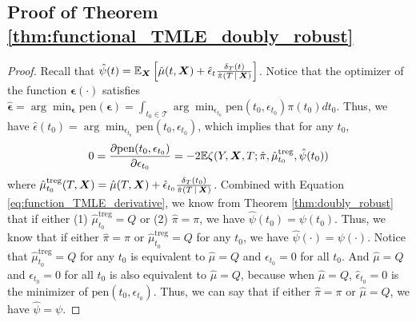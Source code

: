 \subsection{Proof of Theorem \ref{thm:functional_TMLE_doubly_robust}}
\begin{proof}
Recall that $\hat\psi(t)=\mathbb{E}_{\boldsymbol{X}}\left[\hat\mu(t,\boldsymbol{X})+\hat\epsilon_{t}\frac{\delta_{T}(t)}{\hat \pi(T\,|\:\boldsymbol{X})}\right]$.
Notice that the optimizer of the function $\bm\epsilon(\cdot)$ satisfies $\hat{\bm\epsilon}=\arg\min_{\bm\epsilon}\text{pen}(\bm\epsilon)=\int_{t_0\in\mathcal{T}}\arg\min_{\epsilon_{t_0}}\text{pen}(t_0,\epsilon_{t_0})\pi(t_0)dt_0$. Thus, we have $\hat\epsilon(t_0)=\arg\min_{\epsilon_{t_0}}\text{pen}(t_0,\epsilon_{t_0})$, which implies that for any $t_0$,
\begin{equation}\label{eq:function_TMLE_derivative}
    0=\frac{\partial\text{pen}(t_0,\epsilon_{t_0})}{\partial \epsilon_{t_0}}=-2\mathbb{E}\zeta(Y,\boldsymbol{X},T;\hat\pi,\hat\mu^{\text{treg}}_{t_0},\hat\psi(t_0))
\end{equation}
where $\hat\mu^{\text{treg}}_{t_0}(T,\boldsymbol{X})=\hat\mu(T,\boldsymbol{X})+\hat\epsilon_{t_0}\frac{\delta_{T}(t_0)}{\hat \pi(T\,|\:\boldsymbol{X})}$. Combined with Equation \eqref{eq:function_TMLE_derivative}, we know from Theorem \ref{thm:doubly_robust} that if either (1) $\hat\mu^{\text{treg}}_{t_0}=Q$ or (2) $\hat \pi=\pi$,  we have $\hat\psi(t_0)=\psi(t_0)$. Thus, we know that if either $\hat\pi=\pi$ or $\hat\mu^{\text{treg}}_{t_0}=Q$ for any $t_0$, we have $\hat\psi(\cdot)=\psi(\cdot)$. Notice that $\hat\mu^{\text{treg}}_{t_0}=Q$ for any $t_0$ is equivalent to $\hat\mu=Q$ and $\epsilon_{t_0}=0$ for all $t_0$. And $\hat\mu=Q$ and $\epsilon_{t_0}=0$ for all $t_0$ is also equivalent to $\hat\mu=Q$, because when $\hat\mu=Q$, $\hat\epsilon_{t_0}=0$ is the minimizer of $\text{pen}(t_0,\epsilon_{t_0})$. Thus, we can say that if either $\hat\pi=\pi$ or $\hat\mu=Q$, we have $\hat\psi=\psi$.
\end{proof}


